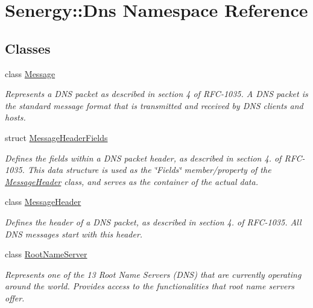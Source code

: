 \hypertarget{namespace_senergy_1_1_dns}{\section{Senergy\-:\-:Dns Namespace Reference}
\label{namespace_senergy_1_1_dns}
}
\subsection*{Classes}
\begin{DoxyCompactItemize}
\item 
class \hyperlink{class_senergy_1_1_dns_1_1_message}{Message}
\begin{DoxyCompactList}\small\item\em Represents a D\-N\-S packet as described in section 4 of R\-F\-C-\/1035. A D\-N\-S packet is the standard message format that is transmitted and received by D\-N\-S clients and hosts. \end{DoxyCompactList}\item 
struct \hyperlink{struct_senergy_1_1_dns_1_1_message_header_fields}{Message\-Header\-Fields}
\begin{DoxyCompactList}\small\item\em Defines the fields within a D\-N\-S packet header, as described in section 4. of R\-F\-C-\/1035. This data structure is used as the \char`\"{}\-Fields\char`\"{} member/property of the \hyperlink{class_senergy_1_1_dns_1_1_message_header}{Message\-Header} class, and serves as the container of the actual data. \end{DoxyCompactList}\item 
class \hyperlink{class_senergy_1_1_dns_1_1_message_header}{Message\-Header}
\begin{DoxyCompactList}\small\item\em Defines the header of a D\-N\-S packet, as described in section 4. of R\-F\-C-\/1035. All D\-N\-S messages start with this header. \end{DoxyCompactList}\item 
class \hyperlink{class_senergy_1_1_dns_1_1_root_name_server}{Root\-Name\-Server}
\begin{DoxyCompactList}\small\item\em Represents one of the 13 Root Name Servers (D\-N\-S) that are currently operating around the world. Provides access to the functionalities that root name servers offer. \end{DoxyCompactList}\end{DoxyCompactItemize}
